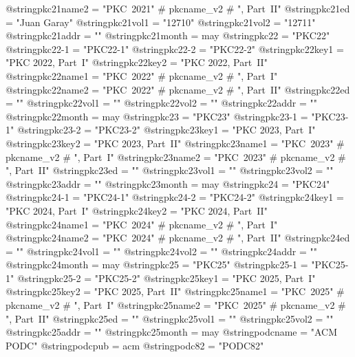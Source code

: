 @string{pkc21name2 =            "PKC~2021" # pkcname_v2 # ", Part~II"}
@string{pkc21ed =               "Juan Garay"}
@string{pkc21vol1 =             "12710"}
@string{pkc21vol2 =             "12711"}
@string{pkc21addr =             ""}
@string{pkc21month =            may}
@string{pkc22 =                 "PKC22"}
@string{pkc22-1 =               "PKC22-1"}
@string{pkc22-2 =               "PKC22-2"}
@string{pkc22key1 =             "PKC 2022, Part~I"}
@string{pkc22key2 =             "PKC 2022, Part~II"}
@string{pkc22name1 =            "PKC~2022" # pkcname_v2 # ", Part~I"}
@string{pkc22name2 =            "PKC~2022" # pkcname_v2 # ", Part~II"}
@string{pkc22ed =               ""}
@string{pkc22vol1 =             ""}
@string{pkc22vol2 =             ""}
@string{pkc22addr =             ""}
@string{pkc22month =            may}
@string{pkc23 =                 "PKC23"}
@string{pkc23-1 =               "PKC23-1"}
@string{pkc23-2 =               "PKC23-2"}
@string{pkc23key1 =             "PKC 2023, Part~I"}
@string{pkc23key2 =             "PKC 2023, Part~II"}
@string{pkc23name1 =            "PKC~2023" # pkcname_v2 # ", Part~I"}
@string{pkc23name2 =            "PKC~2023" # pkcname_v2 # ", Part~II"}
@string{pkc23ed =               ""}
@string{pkc23vol1 =             ""}
@string{pkc23vol2 =             ""}
@string{pkc23addr =             ""}
@string{pkc23month =            may}
@string{pkc24 =                 "PKC24"}
@string{pkc24-1 =               "PKC24-1"}
@string{pkc24-2 =               "PKC24-2"}
@string{pkc24key1 =             "PKC 2024, Part~I"}
@string{pkc24key2 =             "PKC 2024, Part~II"}
@string{pkc24name1 =            "PKC~2024" # pkcname_v2 # ", Part~I"}
@string{pkc24name2 =            "PKC~2024" # pkcname_v2 # ", Part~II"}
@string{pkc24ed =               ""}
@string{pkc24vol1 =             ""}
@string{pkc24vol2 =             ""}
@string{pkc24addr =             ""}
@string{pkc24month =            may}
@string{pkc25 =                 "PKC25"}
@string{pkc25-1 =               "PKC25-1"}
@string{pkc25-2 =               "PKC25-2"}
@string{pkc25key1 =             "PKC 2025, Part~I"}
@string{pkc25key2 =             "PKC 2025, Part~II"}
@string{pkc25name1 =            "PKC~2025" # pkcname_v2 # ", Part~I"}
@string{pkc25name2 =            "PKC~2025" # pkcname_v2 # ", Part~II"}
@string{pkc25ed =               ""}
@string{pkc25vol1 =             ""}
@string{pkc25vol2 =             ""}
@string{pkc25addr =             ""}
@string{pkc25month =            may}
@string{podcname =              "ACM PODC"}
@string{podcpub =               acm}
@string{podc82 =                "PODC82"}
